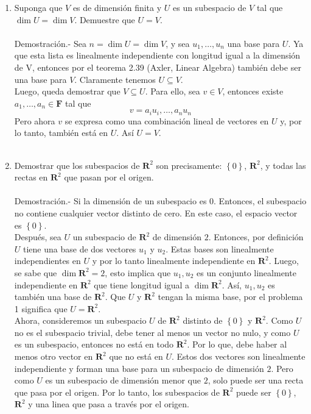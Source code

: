 \begin{enumerate}[\bfseries 1.]

    \item Suponga que $V$ es de dimensión finita y $U$ es un subespacio de $V$ tal que $\dim U=\dim V$. Demuestre que $U=V$.\\\\
	Demostración.-\; Sea $n=\dim U = \dim V$, y sea $u_1,\ldots,u_n$ una base para $U$. Ya que esta lista es linealmente independiente con longitud igual a la dimensión de V, entonces por el teorema 2.39 (Axler, Linear Algebra) también debe ser una base para $V$. Claramente tenemos $U\subseteq V$.\\
	Luego, queda demostrar que $V\subseteq U$. Para ello, sea $v\in V$, entonces existe $a_1,\ldots,a_n\in \textbf{F}$ tal que
	$$v=a_iu_i,\ldots,a_nu_n$$
	Pero ahora $v$ se expresa como una combinación lineal de vectores en $U$ y, por lo tanto, también está en $U$. Así $U = V$.\\\\

    \item Demostrar que los subespacios de $\textbf{R}^2$ son precisamente: $\left\{0\right\}$, $\textbf{R}^2$, y todas las rectas en $\textbf{R}^2$ que pasan por el origen.\\\\
	Demostración.-\; Si la dimensión de un subespacio es $0$. Entonces, el subespacio no contiene cualquier vector distinto de cero. En este caso, el espacio vector es $\left\{0\right\}$.\\
	Después, sea $U$ un subespacio de $\textbf{R}^2$ de dimensión $2$. Entonces, por definición $U$ tiene una base de dos vectores $u_1$ y $u_2$. Estas bases son linealmente independientes en $U$ y por lo tanto linealmente independiente en $\textbf{R}^2$. Luego, se sabe que $\dim \textbf{R}^2=2$, esto implica que $u_1,u_2$ es un conjunto linealmente independiente en $\textbf{R}^2$ que tiene longitud igual a $\dim \textbf{R}^2$. Así, $u_1,u_2$ es también una base de $\textbf{R}^2$. Que $U$ y $\textbf{R}^2$ tengan la misma base, por el problema 1 significa que $U=\textbf{R}^2$.\\
	Ahora, consideremos un subespacio $U$ de $\textbf{R}^2$ distinto de $\left\{0\right\}$ y $\textbf{R}^2$. Como $U$ no es el subespacio trivial, debe tener al menos un vector no nulo, y como $U$ es un subespacio, entonces no está en todo $\textbf{R}^2$. Por lo que, debe haber al menos otro vector en $\textbf{R}^2$ que no está en $U$. Estos dos vectores son linealmente independiente y forman una base para un subespacio de dimensión $2$. Pero como $U$ es un subespacio de dimensión menor que $2$, solo puede ser una recta que pasa por el origen. Por lo tanto, los subespacios de $\textbf{R}^2$ puede ser $\left\{0\right\}$, $\textbf{R}^2$ y una linea que pasa a través por el origen.\\\\


\end{enumerate}
